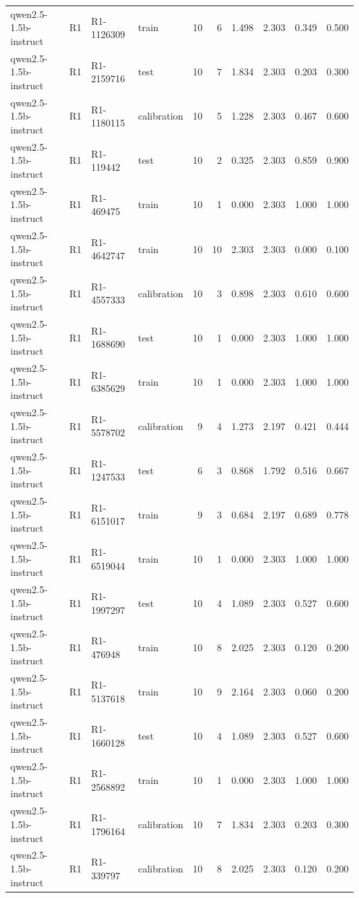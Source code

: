 \begin{table}
\begin{tabular}{llllrrrrrr}
qwen2.5-1.5b-instruct & R1 & R1-1126309 & train & 10 & 6 & 1.498 & 2.303 & 0.349 & 0.500 \\
qwen2.5-1.5b-instruct & R1 & R1-2159716 & test & 10 & 7 & 1.834 & 2.303 & 0.203 & 0.300 \\
qwen2.5-1.5b-instruct & R1 & R1-1180115 & calibration & 10 & 5 & 1.228 & 2.303 & 0.467 & 0.600 \\
qwen2.5-1.5b-instruct & R1 & R1-119442 & test & 10 & 2 & 0.325 & 2.303 & 0.859 & 0.900 \\
qwen2.5-1.5b-instruct & R1 & R1-469475 & train & 10 & 1 & 0.000 & 2.303 & 1.000 & 1.000 \\
qwen2.5-1.5b-instruct & R1 & R1-4642747 & train & 10 & 10 & 2.303 & 2.303 & 0.000 & 0.100 \\
qwen2.5-1.5b-instruct & R1 & R1-4557333 & calibration & 10 & 3 & 0.898 & 2.303 & 0.610 & 0.600 \\
qwen2.5-1.5b-instruct & R1 & R1-1688690 & test & 10 & 1 & 0.000 & 2.303 & 1.000 & 1.000 \\
qwen2.5-1.5b-instruct & R1 & R1-6385629 & train & 10 & 1 & 0.000 & 2.303 & 1.000 & 1.000 \\
qwen2.5-1.5b-instruct & R1 & R1-5578702 & calibration & 9 & 4 & 1.273 & 2.197 & 0.421 & 0.444 \\
qwen2.5-1.5b-instruct & R1 & R1-1247533 & test & 6 & 3 & 0.868 & 1.792 & 0.516 & 0.667 \\
qwen2.5-1.5b-instruct & R1 & R1-6151017 & train & 9 & 3 & 0.684 & 2.197 & 0.689 & 0.778 \\
qwen2.5-1.5b-instruct & R1 & R1-6519044 & train & 10 & 1 & 0.000 & 2.303 & 1.000 & 1.000 \\
qwen2.5-1.5b-instruct & R1 & R1-1997297 & test & 10 & 4 & 1.089 & 2.303 & 0.527 & 0.600 \\
qwen2.5-1.5b-instruct & R1 & R1-476948 & train & 10 & 8 & 2.025 & 2.303 & 0.120 & 0.200 \\
qwen2.5-1.5b-instruct & R1 & R1-5137618 & train & 10 & 9 & 2.164 & 2.303 & 0.060 & 0.200 \\
qwen2.5-1.5b-instruct & R1 & R1-1660128 & test & 10 & 4 & 1.089 & 2.303 & 0.527 & 0.600 \\
qwen2.5-1.5b-instruct & R1 & R1-2568892 & train & 10 & 1 & 0.000 & 2.303 & 1.000 & 1.000 \\
qwen2.5-1.5b-instruct & R1 & R1-1796164 & calibration & 10 & 7 & 1.834 & 2.303 & 0.203 & 0.300 \\
qwen2.5-1.5b-instruct & R1 & R1-339797 & calibration & 10 & 8 & 2.025 & 2.303 & 0.120 & 0.200 \\

\end{tabular}
\end{table}
